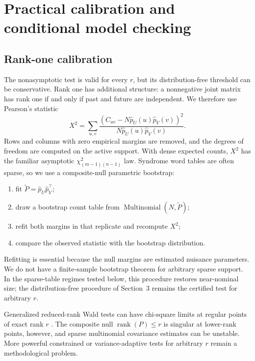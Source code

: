 \documentclass[11pt]{article}
\newcommand{\rank}{\operatorname{rank}}
\begin{document}
\section{Practical calibration and conditional model checking}
\label{sec:practical}

\subsection{Rank-one calibration}
The nonasymptotic test is valid for every $r$, but its distribution-free threshold can be conservative. Rank one has additional structure: a nonnegative joint matrix has rank one if and only if past and future are independent. We therefore use Pearson's statistic
\begin{equation}
    X^2=\sum_{u,v}\frac{(C_{uv}-N\widehat p_U(u)\widehat p_V(v))^2}
    {N\widehat p_U(u)\widehat p_V(v)}.
    \label{eq:pearson}
\end{equation}
Rows and columns with zero empirical margins are removed, and the degrees of freedom are computed on the active support. With dense expected counts, $X^2$ has the familiar asymptotic $\chi^2_{(m-1)(n-1)}$ law. Syndrome word tables are often sparse, so we use a composite-null parametric bootstrap:
\begin{enumerate}[leftmargin=*]
    \item fit $\widetilde P=\widehat p_U\widehat p_V^\top$;
    \item draw a bootstrap count table from $\operatorname{Multinomial}(N,\widetilde P)$;
    \item refit both margins in that replicate and recompute $X^2$;
    \item compare the observed statistic with the bootstrap distribution.
\end{enumerate}
Refitting is essential because the null margins are estimated nuisance parameters. We do not have a finite-sample bootstrap theorem for arbitrary sparse support. In the sparse-table regimes tested below, this procedure restores near-nominal size; the distribution-free procedure of Section~3 remains the certified test for arbitrary $r$.

Generalized reduced-rank Wald tests can have chi-square limits at regular points of exact rank $r$ \cite{robin2000rank,kleibergen2006rank}. The composite null $\rank(P)\le r$ is singular at lower-rank points, however, and sparse multinomial covariance estimates can be unstable. More powerful constrained or variance-adaptive tests for arbitrary $r$ remain a methodological problem.
\end{document}
